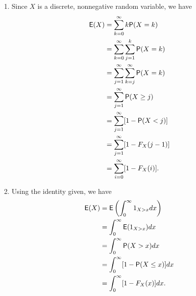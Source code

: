 \documentclass[12pt]{article}
\newcommand{\Prob}{{\sf P}}
\newcommand{\E}{{\sf E}}
\newenvironment{problem}[2][Problem]{\begin{trivlist}
\item[\hskip \labelsep {\bfseries #1}\hskip \labelsep {\bfseries #2.}]}
{\end{trivlist}}
\begin{document}
\begin{problem}{2}
\begin{itemize}
\begin{enumerate}
      \item Since $X$ is a discrete, nonnegative random variable, we have 
      \[
        \begin{aligned}
          \E(X) &= \sum_{k=0}^\infty k \Prob(X = k) \\
          &= \sum_{k=0}^\infty \sum_{j=1}^k \Prob(X = k) \\
          &= \sum_{j=1}^\infty \sum_{k=j}^\infty \Prob(X = k) \\
          &= \sum_{j=1}^\infty \Prob(X \geq j) \\
          &= \sum_{j=1}^\infty [1 - \Prob(X < j)] \\
          &= \sum_{j=1}^\infty [1 - F_X(j-1)] \\
          &= \sum_{i=0}^\infty [1 - F_X(i)].
        \end{aligned}
      \]

      \item Using the identity given, we have
      \[
        \begin{aligned}
          \E(X) &= \E\left(\int_0^\infty 1_{X > x} dx\right) \\
          &= \int_0^\infty \E(1_{X > x}) dx \\
          &= \int_0^\infty \Prob(X > x) dx \\
          &= \int_0^\infty [1 - \Prob(X \leq x)] dx \\
          &= \int_0^\infty [1 - F_X(x)] dx.
        \end{aligned}
      \]
    \end{enumerate}
  \end{itemize}
\end{problem}
\end{document}
